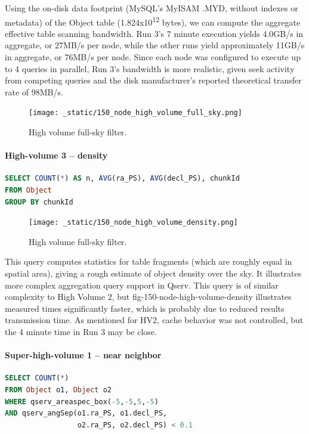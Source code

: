 \documentclass[DM,lsstdraft,toc]{lsstdoc}
\begin{document}
Using the on-disk data footprint (MySQL's MyISAM .MYD, without indexes
or metadata) of the Object table (1.824x10\textsuperscript{12} bytes),
we can compute the aggregate effective table scanning bandwidth. Run 3's
7 minute execution yields 4.0GB/s in aggregate, or 27MB/s per node,
while the other runs yield approximately 11GB/s in aggregate, or 76MB/s
per node. Since each node was configured to execute up to 4 queries in
parallel, Run 3's bandwidth is more realistic, given seek activity from
competing queries and the disk manufacturer's reported theoretical
transfer rate of 98MB/s.

\begin{figure}[H]
\centering
\texttt{[image: \_static/150\_node\_high\_volume\_full\_sky.png]}
\caption{High volume full-sky filter.}
\end{figure}

\paragraph{High-volume 3 -- density}\label{high-volume-3-density}

\begin{lstlisting}[language=SQL]
SELECT COUNT(*) AS n, AVG(ra_PS), AVG(decl_PS), chunkId
FROM Object
GROUP BY chunkId
\end{lstlisting}

\begin{figure}[H]
\centering
\texttt{[image: \_static/150\_node\_high\_volume\_density.png]}
\caption{High volume full-sky filter.}
\end{figure}

This query computes statistics for table fragments (which are roughly
equal in spatial area), giving a rough estimate of object density over
the sky. It illustrates more complex aggregation query support in Qserv.
This query is of similar complexity to High Volume 2, but
fig-150-node-high-volume-density illustrates measured times
significantly faster, which is probably due to reduced results
transmission time. As mentioned for HV2, cache behavior was not
controlled, but the 4 minute time in Run 3 may be close.

\paragraph{Super-high-volume 1 -- near
neighbor}\label{super-high-volume-1-near-neighbor}

\begin{lstlisting}[language=SQL]
SELECT COUNT(*)
FROM Object o1, Object o2
WHERE qserv_areaspec_box(-5,-5,5,-5)
AND qserv_angSep(o1.ra_PS, o1.decl_PS,
                 o2.ra_PS, o2.decl_PS) < 0.1
\end{lstlisting}
\end{document}
